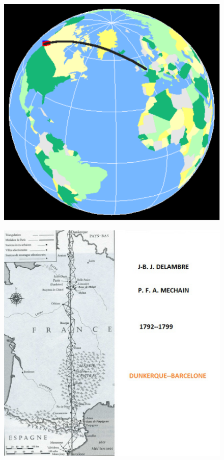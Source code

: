 \documentclass[12pt]{article}
\begin{document}
\begin{figure}[H]
\centering
\begin{minipage}{.5\textwidth}
  \centering
  \includegraphics[width=.66\linewidth]{geodesicpath2.pdf}
  \label{geodesic}
\end{minipage}%
\begin{minipage}{.5\textwidth}
  \centering
  \includegraphics[width=.64\linewidth]{mechain1.pdf}
  \label{geodesic1}
\end{minipage}
\end{figure}
\end{document}

